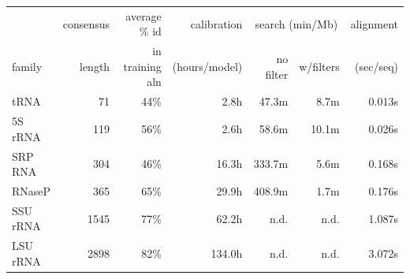 \documentclass[11pt]{article}
\begin{document}
\begin{table}[htb]
\begin{center}
\begin{tabular}{lrr|r|rr|r|} 
       & consensus & average \% id   & calibration  & \multicolumn{2}{c|}{search (min/Mb)} & alignment \\
family & length    & in training aln & (hours/model)& no filter & w/filters & (sec/seq) \\ \hline
tRNA    & 71       & 44\%            &       2.8h   &     47.3m &       8.7m&  0.013s \\
5S rRNA & 119      & 56\%            &       2.6h   &     58.6m &      10.1m&  0.026s \\
SRP RNA & 304      & 46\%            &      16.3h   &    333.7m &       5.6m&  0.168s \\
RNaseP  & 365      & 65\%            &      29.9h   &    408.9m &       1.7m&  0.176s \\
SSU rRNA& 1545     & 77\%            &      62.2h   &      n.d. &       n.d.&  1.087s \\
LSU rRNA& 2898     & 82\%            &     134.0h   &      n.d. &       n.d.&  3.072s \\

\end{tabular}


\end{center}
\end{table}
\end{document}
